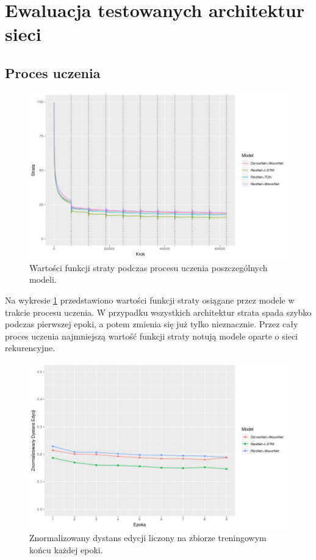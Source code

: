 \documentclass[a4paper,11pt,twoside]{report}
\theoremstyle{definition}
\begin{document}
\section{Ewaluacja testowanych architektur sieci}

\subsection{Proces uczenia}

\begin{figure}[h!]
	\centering
	\includegraphics[scale=0.8]{training_loss}
	\caption{Wartości funkcji straty podczas procesu uczenia poszczególnych modeli.}
	\label{fig:training}
\end{figure}

Na wykresie \ref{fig:training} przedstawiono wartości funkcji straty osiągane przez modele w trakcie procesu uczenia. W przypadku wszystkich architektur strata spada szybko podczas pierwszej epoki, a potem zmienia się już tylko nieznacznie. Przez cały proces uczenia najmniejszą wartość funkcji straty notują modele oparte o sieci rekurencyjne. 

\begin{figure}[h!]
	\centering
	\includegraphics[scale=0.8]{val_distance}
	\caption{Znormalizowany dystans edycji liczony na zbiorze treningowym końcu każdej epoki.}
	\label{fig:val_distance}
\end{figure}
	
\end{document}
